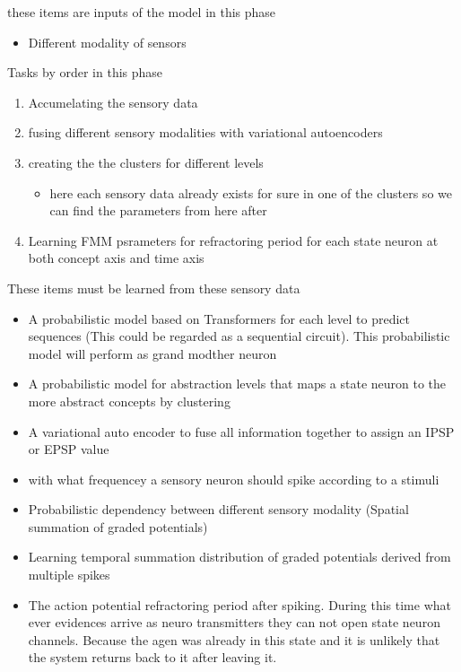 \documentclass[a4paper]{article}
\begin{document}
            these items are inputs of the model in this phase
            \begin{itemize}
                \item Different modality of sensors
            \end{itemize}
            
            Tasks by order in this phase
            \begin{enumerate}
                \item Accumelating the sensory data
                \item fusing different sensory modalities with variational autoencoders
                \item creating the the clusters for different levels
                \begin{itemize}
                    \item here each sensory data already exists for sure in one of the clusters so we can find the parameters from here after
                \end{itemize}
                \item Learning FMM psrameters for refractoring period for each state neuron at both concept axis and time axis
            \end{enumerate}
            
            These items must be learned from these sensory data
            \begin{itemize}
                \item A probabilistic model based on Transformers for each level to predict sequences (This could be regarded as a sequential circuit). This probabilistic model will perform as grand modther neuron
                \item A probabilistic model for abstraction levels that maps a state neuron to the more abstract concepts by clustering
                \item A variational auto encoder to fuse all information together to assign an IPSP or EPSP value
                \item with what frequencey a sensory neuron should spike according to a stimuli
                \item Probabilistic dependency between different sensory modality (Spatial summation of graded potentials)
                \item Learning temporal summation distribution of graded potentials derived from multiple spikes
                \item The action potential refractoring period after spiking. During this time what ever evidences arrive as neuro transmitters they can not open state neuron channels. Because the agen was already in this state and it is unlikely that the system returns back to it after leaving it.
            \end{itemize}
        
\end{document}
